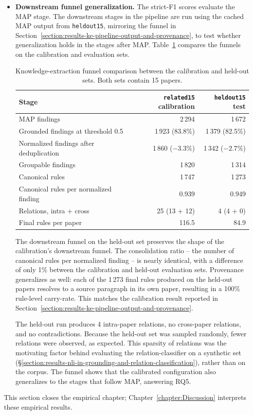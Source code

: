 \begin{itemize}[label={},leftmargin=1.5em]
    \item \textbf{Downstream funnel generalization.} The strict-F1 scores evaluate the MAP stage. The downstream stages in the pipeline are run using the cached MAP output from \texttt{heldout15}, mirroring the funnel in Section~\ref{section:results-ke-pipeline-output-and-provenance}, to test whether generalization holds in the stages after MAP. Table~\ref{tab:results-heldout-ke-funnel} compares the funnels on the calibration and evaluation sets.

    \begin{table}[htpb]
    \caption[Held-out knowledge-extraction funnel]{Knowledge-extraction funnel comparison between the calibration and held-out sets. Both sets contain 15 papers.}
    \label{tab:results-heldout-ke-funnel}
    \centering
    \begin{tabular}{l r r}
        \toprule
        Stage & \texttt{related15} calibration & \texttt{heldout15} test \\
        \midrule
        MAP findings & 2\,294 & 1\,672 \\
        Grounded findings at threshold 0.5 & 1\,923 (83.8\%) & 1\,379 (82.5\%) \\
        Normalized findings after deduplication & 1\,860 ($-3.3\%$) & 1\,342 ($-2.7\%$) \\
        Groupable findings & 1\,820 & 1\,314 \\
        Canonical rules & 1\,747 & 1\,273 \\
        Canonical rules per normalized finding & 0.939 & 0.949 \\
        Relations, intra + cross & 25 (13 + 12) & 4 (4 + 0) \\
        Final rules per paper & 116.5 & 84.9 \\
        \bottomrule
    \end{tabular}
    \end{table}

    The downstream funnel on the held-out set preserves the shape of the calibration's downstream funnel. The consolidation ratio -- the number of canonical rules per normalized finding -- is nearly identical, with a difference of only 1\% between the calibration and held-out evaluation sets. Provenance generalizes as well: each of the 1\,273 final rules produced on the held-out papers resolves to a source paragraph in its own paper, resulting in a 100\% rule-level carry-rate. This matches the calibration result reported in Section~\ref{section:results-ke-pipeline-output-and-provenance}.
    
    The held-out run produces 4 intra-paper relations, no cross-paper relations, and no contradictions. Because the held-out set was sampled randomly, fewer relations were observed, as expected. This sparsity of relations was the motivating factor behind evaluating the relation-classifier on a synthetic set (§\ref{section:results-nli-in-grounding-and-relation-classification}), rather than on the corpus. The funnel shows that the calibrated configuration also generalizes to the stages that follow MAP, answering RQ5. 

\end{itemize}

This section closes the empirical chapter; Chapter~\ref{chapter:Discussion} interprets these empirical results.